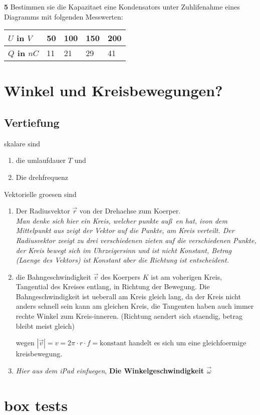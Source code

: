\documentclass{report}
\begin{document}
\textbf{5}
Bestimmen sie die Kapazitaet eine Kondensators unter Zuhlifenahme eines
Diagramms mit folgenden Messwerten:

\begin{table}[htpb]
  \begin{center}
    \begin{tabular}{|l|l|l|l|l|}
      \hline
      \textbf{$U$ in $V$} & 50 & 100 & 150 & 200 \\
      \hline
      \textbf{$Q$ in $nC$}& 11 &  21 &  29 &  41 \\
      \hline
    \end{tabular}
  \end{center}
\end{table}


\section{Winkel und Kreisbewegungen?}
\subsection{Vertiefung}
skalare sind
\begin{enumerate}
  \item die umlaufdauer $T$ und 
  \item Die drehfrequenz
\end{enumerate}

Vektorielle groesen sind
\begin{enumerate}
  \item Der Radiusvektor $\vec{r}$ von der Drehachse zum Koerper.\\
    \textit{Man denke sich hier ein Kreis, welcher punkte au\ss~en hat, ivon
    dem Mittelpunkt aus zeigt der Vektor auf die Punkte, am Kreis verteilt. Der
    Radiusvektor zeeigt zu drei verschiedenen zieten auf die verschiedenen
    Punkte, der Kreis bewegt sich im Uhrzeigersinn und ist nicht Konstant, Betrag
    (Laenge des Vektors) ist Konstant aber die Richtung ist entscheident.}
  \item die Bahngeschwindigkeit $\vec{v}$ des Koerpers $K$ ist am voherigen
    Kreis, Tangential des Kreises entlang, in Richtung der Bewegung.
    Die Bahngeschwindigkeit ist ueberall am Kreis gleich lang, da der Kreis
    nicht anders schnell sein kann am gleichen Kreis, die Tangenten haben auch
    immer rechte Winkel zum Kreis-inneren.
    (Richtung aendert sich staendig, betrag bleibt meist gleich)

    wegen $|\vec{v}|=v=2\pi\cdot r\cdot f= \text{konstant}$  handelt es sich um
    eine gleichfoermige kreisbewegung.
  \item \textit{Hier aus dem iPad einfuegen}, \textbf{Die Winkelgeschwindigkeit $\vec{\omega}$} 


\end{enumerate}

\section{box tests}
\end{document}
